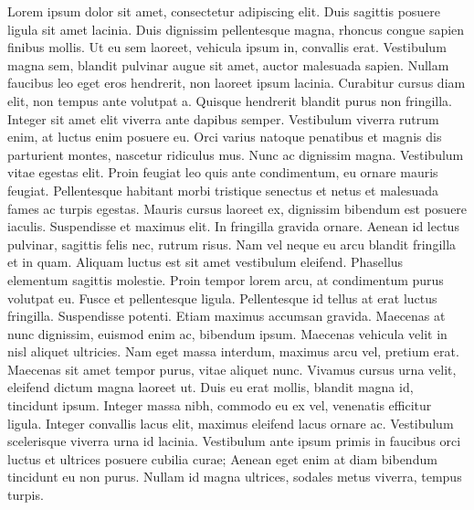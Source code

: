 \documentclass[
  letterpaper,
  toc=chapterentrywithdots,
  listof=totoc,
  11pt,
  headings=small,
  usegeometry]{scrreprt}
\begin{document}
Lorem ipsum dolor sit amet, consectetur adipiscing elit. Duis sagittis
posuere ligula sit amet lacinia. Duis dignissim pellentesque magna,
rhoncus congue sapien finibus mollis. Ut eu sem laoreet, vehicula ipsum
in, convallis erat. Vestibulum magna sem, blandit pulvinar augue sit
amet, auctor malesuada sapien. Nullam faucibus leo eget eros hendrerit,
non laoreet ipsum lacinia. Curabitur cursus diam elit, non tempus ante
volutpat a. Quisque hendrerit blandit purus non fringilla. Integer sit
amet elit viverra ante dapibus semper. Vestibulum viverra rutrum enim,
at luctus enim posuere eu. Orci varius natoque penatibus et magnis dis
parturient montes, nascetur ridiculus mus. Nunc ac dignissim magna.
Vestibulum vitae egestas elit. Proin feugiat leo quis ante condimentum,
eu ornare mauris feugiat. Pellentesque habitant morbi tristique senectus
et netus et malesuada fames ac turpis egestas. Mauris cursus laoreet ex,
dignissim bibendum est posuere iaculis. Suspendisse et maximus elit. In
fringilla gravida ornare. Aenean id lectus pulvinar, sagittis felis nec,
rutrum risus. Nam vel neque eu arcu blandit fringilla et in quam.
Aliquam luctus est sit amet vestibulum eleifend. Phasellus elementum
sagittis molestie. Proin tempor lorem arcu, at condimentum purus
volutpat eu. Fusce et pellentesque ligula. Pellentesque id tellus at
erat luctus fringilla. Suspendisse potenti. Etiam maximus accumsan
gravida. Maecenas at nunc dignissim, euismod enim ac, bibendum ipsum.
Maecenas vehicula velit in nisl aliquet ultricies. Nam eget massa
interdum, maximus arcu vel, pretium erat. Maecenas sit amet tempor
purus, vitae aliquet nunc. Vivamus cursus urna velit, eleifend dictum
magna laoreet ut. Duis eu erat mollis, blandit magna id, tincidunt
ipsum. Integer massa nibh, commodo eu ex vel, venenatis efficitur
ligula. Integer convallis lacus elit, maximus eleifend lacus ornare ac.
Vestibulum scelerisque viverra urna id lacinia. Vestibulum ante ipsum
primis in faucibus orci luctus et ultrices posuere cubilia curae; Aenean
eget enim at diam bibendum tincidunt eu non purus. Nullam id magna
ultrices, sodales metus viverra, tempus turpis. 

\begin{table}[htp]

\caption{\label{tbl-summary}Summary of Clinical Studies Used In the
Analysis}

\centering{



}

\end{table}%
\end{document}
